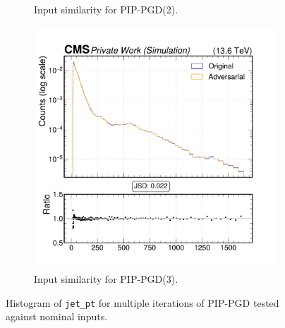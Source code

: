 \begin{figure}[htbp]
\begin{subfigure}[t]{0.32\textwidth}
    \caption*{Input similarity for PIP-PGD(2).}
  \end{subfigure}\hfill
  \begin{subfigure}[t]{0.32\textwidth}
    \includegraphics[width=\linewidth]{media/output/features/compare/combined_it_3/cmp_global_features_jet_pt.pdf}
    \caption*{Input similarity for PIP-PGD(3).}
  \end{subfigure}

  \caption*{Histogram of \texttt{jet\_pt} for multiple iterations of PIP-PGD tested against nominal inputs.}
  \label{fig:combined_input_jet_pt}
\end{figure}

